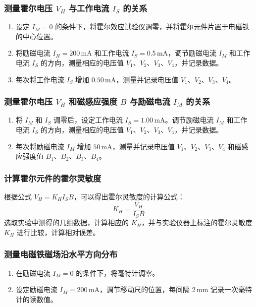 \documentclass[UTF-8,twoside,cs4size]{ctexart}
\begin{document}
\subsubsection{测量霍尔电压 $V_H$ 与工作电流 $I_S$ 的关系}
\begin{enumerate}
    \item 设定 $I_M = 0$ 的条件下，将霍尔效应试验仪调零，并将霍尔元件片置于电磁铁的中心位置。\par
    \item 将励磁电流 $I_H = 200 \, \mathrm{mA}$ 和工作电流 $I_S = 0.5 \, \mathrm{mA}$，调节励磁电流 $I_M$ 和工作电流 $I_S$ 的方向，测量相应的电压值 $V_1$、$V_2$、$V_3$、$V_4$，并记录数据。\par
    \item 每次将工作电流 $I_S$ 增加 $0.50 \, \mathrm{mA}$，测量并记录电压值 $V_1$、$V_2$、$V_3$、$V_4$。\par
\end{enumerate}

\subsubsection{测量霍尔电压 $V_H$ 和磁感应强度 $B$ 与励磁电流 $I_M$ 的关系}
\begin{enumerate}
    \item 将 $I_M$ 和 $I_S$ 调零后，设定工作电流 $I_S = 1.00 \, \mathrm{mA}$。调节励磁电流 $I_M$ 和工作电流 $I_S$ 的方向，测量相应的电压值 $V_1$、$V_2$、$V_3$、$V_4$，并记录数据。\par
    \item 每次将励磁电流 $I_M$ 增加 $50 \, \mathrm{mA}$，测量并记录电压值 $V_1$、$V_2$、$V_3$、$V_4$ 和磁感应强度值 $B_1$、$B_2$、$B_3$、$B_4$。\par
\end{enumerate}

\subsubsection{计算霍尔元件的霍尔灵敏度}
根据公式 $V_H = K_H I_S B$，可以得出霍尔灵敏度的计算公式：
\[
K_H = \frac{V_H}{I_S B}
\]
选取实验中测得的几组数据，计算相应的 $K_H$，并与实验仪器上标注的霍尔灵敏度 $K_H$ 进行比较，计算相对误差。

\subsubsection{测量电磁铁磁场沿水平方向分布}
\begin{enumerate}
    \item 在励磁电流 $I_M = 0$ 的条件下，将毫特计调零。\par
    \item 设定励磁电流 $I_M = 200 \, \mathrm{mA}$，调节移动尺的位置，每间隔 $2 \, \mathrm{mm}$ 记录一次毫特计的读数值。\par
\end{enumerate}
\end{document}
